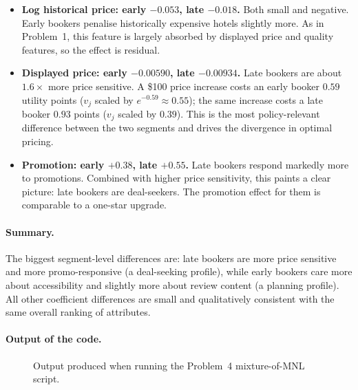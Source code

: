 \documentclass[11pt]{article}
\begin{document}
\begin{itemize}
    weight accessibility more than \emph{twice} as heavily as late
    bookers. Travelers who plan ahead seem to prefer
    transit-/parking-accessible hotels, while last-minute bookers
    accept a worse access score.
  \item \textbf{Log historical price: early $-0.053$, late $-0.018$.}
    Both small and negative. Early bookers penalise historically
    expensive hotels slightly more. As in Problem~1, this feature is
    largely absorbed by displayed price and quality features, so the
    effect is residual.
  \item \textbf{Displayed price: early $-0.00590$, late $-0.00934$.}
    Late bookers are about $1.6\times$ more price sensitive. A
    \$100 price increase costs an early booker $0.59$ utility points
    ($v_j$ scaled by $e^{-0.59}\approx 0.55$); the same increase costs
    a late booker $0.93$ points ($v_j$ scaled by $0.39$). This is the
    most policy-relevant difference between the two segments and
    drives the divergence in optimal pricing.
  \item \textbf{Promotion: early $+0.38$, late $+0.55$.}
    Late bookers respond markedly more to promotions. Combined with
    higher price sensitivity, this paints a clear picture: late bookers
    are deal-seekers. The promotion effect for them is comparable to
    a one-star upgrade.
\end{itemize}

\paragraph{Summary.}
The biggest segment-level differences are: late bookers are more price
sensitive and more promo-responsive (a deal-seeking profile), while early
bookers care more about accessibility and slightly more about review
content (a planning profile). All other coefficient differences are
small and qualitatively consistent with the same overall ranking of
attributes.

\paragraph{Output of the code.}
\begin{figure}[h!]
  \centering
  \caption{Output produced when running the Problem~4 mixture-of-MNL script.}
\end{figure}
\end{document}
